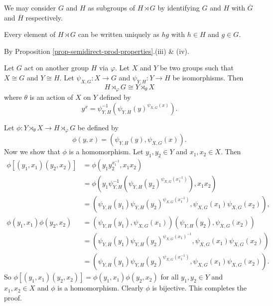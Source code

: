 \begin{remark}
	We may consider $G$ and $H$ as subgroups of $H \rtimes G$ by identifying $G$ and $H$ with $\overline{G}$ and $\overline{H}$ respectively.
\end{remark}

\begin{corollary}
	Every element of $H \rtimes G$ can be written uniquely as $hg$ with $h\in H$ and $g\in G$.
\end{corollary}
\begin{sketch}
	By Proposition \ref{prop-semidirect-prod-properties}.(iii) \& (iv).
\end{sketch}
\begin{proposition} \label{prop-semidirect-prod-isom}
	Let $G$ act on another group $H$ via $\varphi$. Let $X$ and $Y$ be two groups such that $X\cong G$ and $Y\cong H$. Let $\psi_{X,G}:X\rightarrow G$ and $\psi_{Y,H}:Y\rightarrow H$ be isomorphisms. Then $$H\rtimes_{\varphi} G \cong Y\rtimes_{\theta} X$$ where $\theta$ is an action of $X$ on $Y$ defined by 
 \begin{equation*}
		y^{x} = \psi_{Y,H}^{-1}(\psi_{Y,H}(y)^{\psi_{X,G}(x)}).
	\end{equation*}
\end{proposition}
\begin{sketch}
Let $\phi: Y\rtimes_{\theta} X \to H\rtimes_{\varphi} G$ be defined by
	\begin{equation*}
		\phi(y,x) = (\psi_{Y,H}(y), \psi_{X,G}(x)).
	\end{equation*}
	Now we show that $\phi$ is a homomorphism. Let $y_1,y_2\in Y$ and $x_1,x_2\in X$. Then
	\begin{align*}
		\phi[(y_1,x_1)(y_2,x_2)] &= \phi(y_1y_2^{x_1^{-1}},x_1x_2) 
		\\
		&= \phi\left(y_1\psi_{Y,H}^{-1}(\psi_{Y,H}(y_2)^{\psi_{X,G}(x_1^{-1})}),x_1x_2\right) 
		\\
		&= \left(\psi_{Y,H}(y_1)\psi_{Y,H}(y_2)^{\psi_{X,G}(x_1^{-1})},\psi_{X,G}(x_1)\psi_{X,G}(x_2)\right),
		\\
		\phi(y_1,x_1)\phi(y_2,x_2) &=(\psi_{Y,H}(y_1),\psi_{X,G}(x_1))(\psi_{Y,H}(y_2),\psi_{X,G}(x_2))
		\\
		&= \left(\psi_{Y,H}(y_1)\psi_{Y,H}(y_2)^{\psi_{X,G}(x_1)^{-1}}, \psi_{X,G}(x_1)\psi_{X,G}(x_2)\right)
		\\
		&= \left(\psi_{Y,H}(y_1)\psi_{Y,H}(y_2)^{\psi_{X,G}(x_1^{-1})}, \psi_{X,G}(x_1)\psi_{X,G}(x_2)\right).
	\end{align*}
	So $\phi[(y_1,x_1)(y_2,x_2)] = \phi(y_1,x_1)\phi(y_2,x_2)$ for all $y_1,y_2\in Y$ and $x_1,x_2\in X$ and $\phi$ is a homomorphism. Clearly $\phi$ is bijective. This completes the proof.
\end{sketch}
